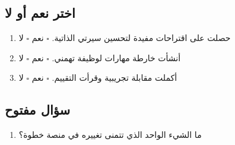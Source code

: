 ﻿\documentclass[11pt]{article}
\begin{document}
\begin{arabic}
\subsection*{اختر نعم أو لا}

\begin{enumerate}[start=10]
  \item حصلت على اقتراحات مفيدة لتحسين سيرتي الذاتية. \hfill $\square$ نعم \quad $\square$ لا
  \item أنشأت خارطة مهارات لوظيفة تهمني. \hfill $\square$ نعم \quad $\square$ لا
  \item أكملت مقابلة تجريبية وقرأت التقييم. \hfill $\square$ نعم \quad $\square$ لا
\end{enumerate}

\subsection*{سؤال مفتوح}

\begin{enumerate}[start=13]
  \item ما الشيء الواحد الذي تتمنى تغييره في منصة خطوة؟
\end{enumerate}

\vspace{0.5em}
\noindent\colorbox{boxgray}{\parbox{\dimexpr\linewidth-2\fboxsep}{
  \vspace{2em}\hfill\vspace{2em}
}}
\end{arabic}
\end{document}

